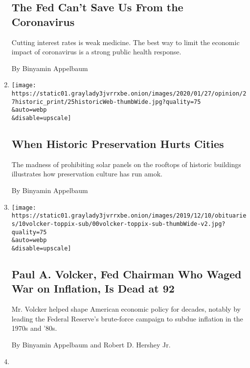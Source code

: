 \begin{enumerate}
  \hypertarget{the-fed-cant-save-us-from-the-coronavirus}{%
  \subsection{The Fed Can't Save Us From the
  Coronavirus}\label{the-fed-cant-save-us-from-the-coronavirus}}

  Cutting interest rates is weak medicine. The best way to limit the
  economic impact of coronavirus is a strong public health response.

  By Binyamin Appelbaum
\item
  \href{/2020/01/26/opinion/historic-preservation-solar-panels.html}{}

  \texttt{[image: https://static01.graylady3jvrrxbe.onion/images/2020/01/27/opinion/27historic\_print/25historicWeb-thumbWide.jpg?quality=75\\\&auto=webp\\\&disable=upscale]}

  \hypertarget{when-historic-preservation-hurts-cities}{%
  \subsection{When Historic Preservation Hurts
  Cities}\label{when-historic-preservation-hurts-cities}}

  The madness of prohibiting solar panels on the rooftops of historic
  buildings illustrates how preservation culture has run amok.

  By Binyamin Appelbaum
\item
  \href{/2019/12/09/business/paul-a-volcker-dead.html}{}

  \texttt{[image: https://static01.graylady3jvrrxbe.onion/images/2019/12/10/obituaries/10volcker-toppix-sub/00volcker-toppix-sub-thumbWide-v2.jpg?quality=75\\\&auto=webp\\\&disable=upscale]}

  \hypertarget{paul-a-volcker-fed-chairman-who-waged-war-on-inflation-is-dead-at-92}{%
  \subsection{Paul A. Volcker, Fed Chairman Who Waged War on Inflation,
  Is Dead at
  92}\label{paul-a-volcker-fed-chairman-who-waged-war-on-inflation-is-dead-at-92}}

  Mr. Volcker helped shape American economic policy for decades, notably
  by leading the Federal Reserve's brute-force campaign to subdue
  inflation in the 1970s and '80s.

  By Binyamin Appelbaum and Robert D. Hershey Jr.
\item
  \href{/2019/12/03/books/review/great-society-amity-shlaes.html}{}


\end{enumerate}
